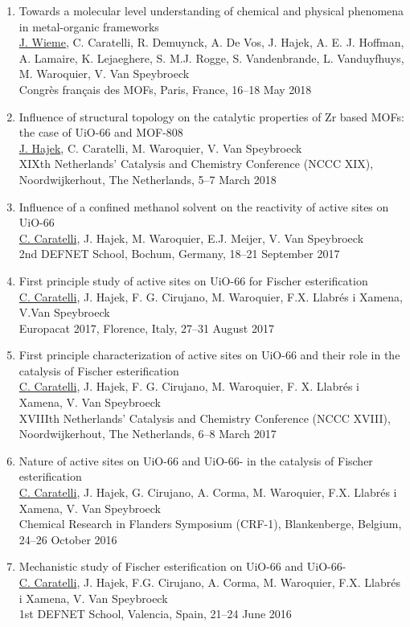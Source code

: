 \begin{enumerate}
\item
Towards a molecular level understanding of chemical and physical phenomena in metal-organic
frameworks\\
\underline{J. Wieme}, C. Caratelli, R. Demuynck, A. De Vos, J. Hajek, A. E. J. Hoffman, A. Lamaire, K. Lejaeghere, S. M.J. Rogge, S. Vandenbrande, L. Vanduyfhuys, M. Waroquier, V. Van Speybroeck\\
Congrès français des MOFs, Paris, France, 16--18 May 2018

\item
Influence of structural topology on the catalytic properties of Zr based MOFs: the case of UiO-66 and MOF-808\\
\underline{J. Hajek}, C. Caratelli, M. Waroquier, V. Van Speybroeck\\
XIXth Netherlands' Catalysis and Chemistry Conference (NCCC XIX),
Noordwijkerhout, The Netherlands, 5--7 March 2018

\item
Influence of a confined methanol solvent on the reactivity of active sites on UiO-66\\
\underline{C. Caratelli}, J. Hajek, M. Waroquier, E.J. Meijer, V. Van Speybroeck\\
2nd DEFNET School, Bochum, Germany, 18--21 September 2017

\item
First principle study of active sites on UiO-66 for Fischer esterification\\
\underline{C. Caratelli}, J. Hajek, F. G. Cirujano, M. Waroquier, F.X. Llabr\'es i Xamena, V.Van Speybroeck\\
Europacat 2017, Florence, Italy, 27--31 August 2017

\item
First principle characterization of active sites on UiO-66 and their role in the
catalysis of Fischer esterification\\
\underline{C. Caratelli}, J. Hajek, F. G. Cirujano, M. Waroquier, F. X. Llabr\'es i Xamena, V. Van Speybroeck \\
XVIIIth Netherlands' Catalysis and Chemistry Conference (NCCC XVIII),
Noordwijkerhout, The Netherlands, 6--8 March 2017

\item 
Nature of active sites on UiO-66 and
UiO-66- in the catalysis of Fischer esterification\\
\underline{C. Caratelli}, J. Hajek, G. Cirujano, A. Corma, M. Waroquier, F.X.
Llabr\'es i Xamena, V. Van Speybroeck\\
Chemical Research in Flanders Symposium (CRF-1), Blankenberge, Belgium, 24--26
October 2016

\item
Mechanistic study of Fischer esterification on UiO-66 and UiO-66-\\
\underline{C. Caratelli}, J. Hajek, F.G. Cirujano, A. Corma, M. Waroquier, F.X.
Llabr\'es i Xamena, V. Van Speybroeck\\
1st DEFNET School, Valencia, Spain, 21--24 June 2016
\end{enumerate}

